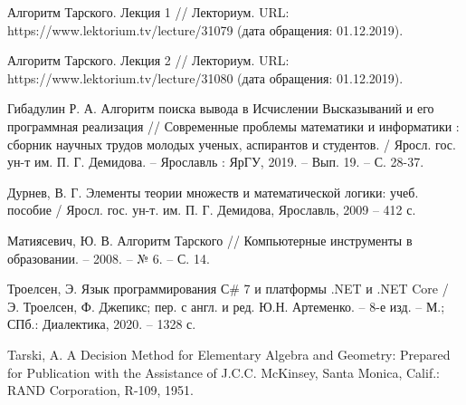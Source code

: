 \begin{thebibliography}{99}
    Алгоритм Тарского. Лекция 1 // Лекториум. URL: https://www.lektorium.tv/lecture/31079 (дата обращения: 01.12.2019).

    Алгоритм Тарского. Лекция 2 // Лекториум. URL: https://www.lektorium.tv/lecture/31080 (дата обращения: 01.12.2019).

    Гибадулин Р. А. Алгоритм поиска вывода в Исчислении Высказываний и его программная реализация // Современные проблемы математики и информатики : сборник научных трудов молодых ученых, аспирантов и студентов. / Яросл. гос. ун-т им. П. Г. Демидова. -- Ярославль : ЯрГУ, 2019. -- Вып. 19. -- С. 28-37.

    Дурнев, В. Г. Элементы теории множеств и математической логики: учеб. пособие / Яросл. гос. ун-т. им. П. Г. Демидова, Ярославль, 2009 -- 412 с.

    Матиясевич, Ю. В. Алгоритм Тарского // Компьютерные инструменты в образовании. -- 2008. -- № 6. -- С. 14.

    Троелсен, Э. Язык программирования С\# 7 и платформы .NET и .NET Core / Э. Троелсен, Ф. Джепикс; пер. с англ. и ред. Ю.Н. Артеменко. -- 8-е изд. -- М.; СПб.: Диалектика, 2020. -- 1328 с.

    Tarski, A. A Decision Method for Elementary Algebra and Geometry: Prepared for Publication with the Assistance of J.C.C. McKinsey, Santa Monica, Calif.: RAND Corporation, R-109, 1951. 

\end{thebibliography}

